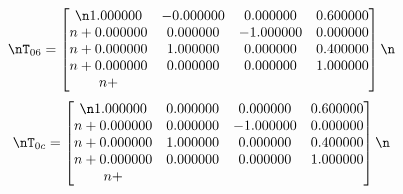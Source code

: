 \begin{equation*}\nT_{06} = \begin{bmatrix}\n1.000000 & -0.000000 & 0.000000 & 0.600000 \\n+0.000000 & 0.000000 & -1.000000 & 0.000000 \\n+0.000000 & 1.000000 & 0.000000 & 0.400000 \\n+0.000000 & 0.000000 & 0.000000 & 1.000000 \\n+\end{bmatrix}\n\end{equation*}\n\n\begin{equation*}\nT_{0c} = \begin{bmatrix}\n1.000000 & 0.000000 & 0.000000 & 0.600000 \\n+0.000000 & 0.000000 & -1.000000 & 0.000000 \\n+0.000000 & 1.000000 & 0.000000 & 0.400000 \\n+0.000000 & 0.000000 & 0.000000 & 1.000000 \\n+\end{bmatrix}\n\end{equation*}\n